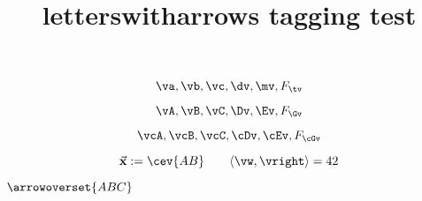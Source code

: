 \documentclass{article}
\title{letterswitharrows tagging test}
\begin{document}
\[ \va, \vb, \vc, \dv, \mv, F_\tv \]

\[ \vA, \vB, \vC, \Dv, \Ev, F_\Gv \]

\[ \vcA, \vcB, \vcC, \cDv, \cEv, F_\cGv \]

\[ \vec{\mathbf{x}} := \cev{AB} \qquad \langle \vw, \vright \rangle = 42 \]

$\arrowoverset{ABC}$
\end{document}
